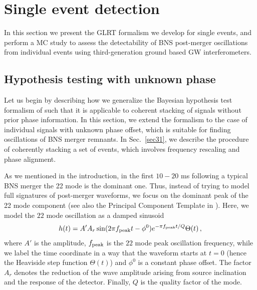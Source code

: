 \documentclass[prd,aps,floatfix,superscriptaddress,nofootinbib,twocolumn,10pt,English]{revtex4-1}
\begin{document}
\section{Single event detection}\label{sec2}

In this section we present the GLRT formalism we develop for single
events, and perform a MC study to assess the detectability of
BNS post-merger oscillations from individual events using
third-generation ground based GW interferometers.

\subsection{Hypothesis testing with unknown phase} \label{sec21}

Let us begin by describing how we generalize the Bayesian hypothesis test
formalism of \cite{yang2017black,Berti:2007zu,Berti:2016lat} such that
it is applicable to coherent stacking of signals without prior phase
information. In this section, we extend the formalism to the case of individual
signals with unknown phase offset, which is suitable for finding
oscillations of BNS merger remnants. In Sec.~\ref{sec31}, we describe the procedure of
coherently stacking a set of events, which involves frequency
rescaling and phase alignment.

As we mentioned in the introduction, in the first $10-20$ ms following
a typical BNS merger the 22 mode is the dominant one. Thus, instead of
trying to model full signatures of post-merger waveforms, we focus on
the dominant peak of the 22 mode component (see also the Principal
Component Template in \cite{clark2016observing}).  Here, we model the
$22$ mode oscillation as a damped sinusoid
%
\begin{align}\label{eq:w22}
h(t) = A'A_r \sin(2\pi
f_{\rm peak} t- \phi^0) e^{- \pi f_{\rm peak} t/Q} \Theta(t)\,,
\end{align}
%
where $A'$ is the amplitude, $f_{\rm peak}$ is the $22$ mode peak
oscillation frequency, while we label the time coordinate in a way
that the waveform starts at $t=0$ (hence the Heaviside step function
$\Theta(t)$) and $\phi^0$ is a constant phase offset. The factor $A_r$
denotes the reduction of the wave amplitude arising from source
inclination and the response of the detector. Finally, $Q$ is the quality
factor of the mode.
\end{document}
